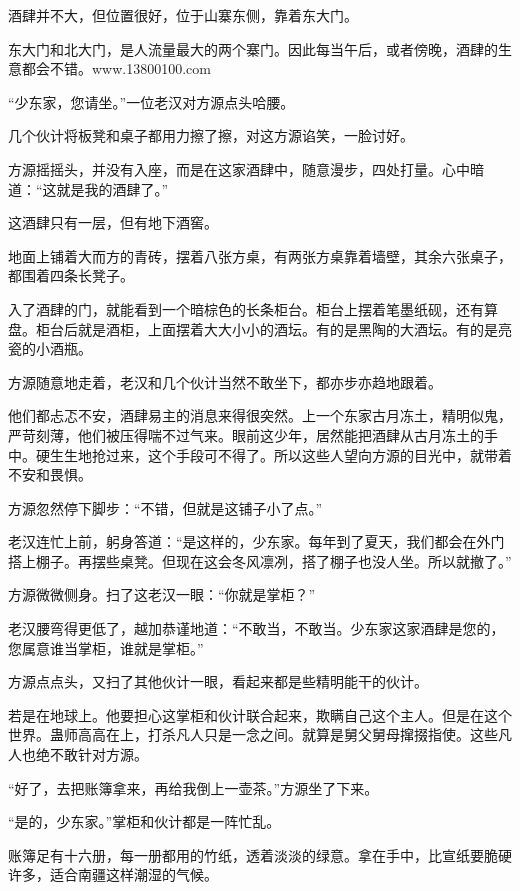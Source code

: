 
\begin{this_body}

酒肆并不大，但位置很好，位于山寨东侧，靠着东大门。

东大门和北大门，是人流量最大的两个寨门。因此每当午后，或者傍晚，酒肆的生意都会不错。www.13800100.com

“少东家，您请坐。”一位老汉对方源点头哈腰。

几个伙计将板凳和桌子都用力擦了擦，对这方源谄笑，一脸讨好。

方源摇摇头，并没有入座，而是在这家酒肆中，随意漫步，四处打量。心中暗道：“这就是我的酒肆了。”

这酒肆只有一层，但有地下酒窖。

地面上铺着大而方的青砖，摆着八张方桌，有两张方桌靠着墙壁，其余六张桌子，都围着四条长凳子。

入了酒肆的门，就能看到一个暗棕色的长条柜台。柜台上摆着笔墨纸砚，还有算盘。柜台后就是酒柜，上面摆着大大小小的酒坛。有的是黑陶的大酒坛。有的是亮瓷的小酒瓶。

方源随意地走着，老汉和几个伙计当然不敢坐下，都亦步亦趋地跟着。

他们都忐忑不安，酒肆易主的消息来得很突然。上一个东家古月冻土，精明似鬼，严苛刻薄，他们被压得喘不过气来。眼前这少年，居然能把酒肆从古月冻土的手中。硬生生地抢过来，这个手段可不得了。所以这些人望向方源的目光中，就带着不安和畏惧。

方源忽然停下脚步：“不错，但就是这铺子小了点。”

老汉连忙上前，躬身答道：“是这样的，少东家。每年到了夏天，我们都会在外门搭上棚子。再摆些桌凳。但现在这会冬风凛冽，搭了棚子也没人坐。所以就撤了。”

方源微微侧身。扫了这老汉一眼：“你就是掌柜？”

老汉腰弯得更低了，越加恭谨地道：“不敢当，不敢当。少东家这家酒肆是您的，您属意谁当掌柜，谁就是掌柜。”

方源点点头，又扫了其他伙计一眼，看起来都是些精明能干的伙计。

若是在地球上。他要担心这掌柜和伙计联合起来，欺瞒自己这个主人。但是在这个世界。蛊师高高在上，打杀凡人只是一念之间。就算是舅父舅母撺掇指使。这些凡人也绝不敢针对方源。

“好了，去把账簿拿来，再给我倒上一壶茶。”方源坐了下来。

“是的，少东家。”掌柜和伙计都是一阵忙乱。

账簿足有十六册，每一册都用的竹纸，透着淡淡的绿意。拿在手中，比宣纸要脆硬许多，适合南疆这样潮湿的气候。


\end{this_body}
